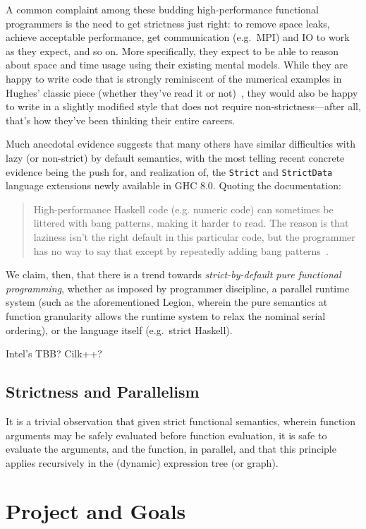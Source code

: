 \documentclass{llncs}
\begin{document}
A common complaint among these budding high-performance functional programmers
is the need to get strictness just right: to remove space leaks, achieve
acceptable performance, get communication (e.g.\ MPI) and IO to work as they
expect, and so on.  More specifically, they expect to be able to reason about
space and time usage using their existing mental models. While they are happy
to write code that is strongly reminiscent of the numerical examples in
Hughes' classic piece (whether they've read it or not)~\cite{Hughes89}, they
would also be happy to write in a slightly modified style that does not
require non-strictness---after all, that's how they've been thinking their
entire careers.

Much anecdotal evidence suggests that many others have similar difficulties
with lazy (or non-strict) by default semantics, with the most telling recent
concrete evidence being the push for, and realization of, the \texttt{Strict}
and \texttt{StrictData} language extensions newly available in GHC 8.0.
Quoting the documentation:
\begin{quote}
High-performance Haskell code (e.g. numeric code) can sometimes be littered
with bang patterns, making it harder to read. The reason is that laziness
isn't the right default in this particular code, but the programmer has no way
to say that except by repeatedly adding bang patterns~\cite{strict-strictdata}.
\end{quote}

We claim, then, that there is a trend towards \emph{strict-by-default pure
  functional programming}, whether as imposed by programmer discipline, a parallel
runtime system (such as the aforementioned Legion, wherein the pure semantics
at function granularity allows the runtime system to relax the nominal serial
ordering), or the language itself (e.g.\ strict Haskell).

Intel's TBB?  Cilk++?

\subsection{Strictness and Parallelism}

It is a trivial observation that given strict functional semantics, wherein
function arguments may be safely evaluated before function evaluation, it is
safe to evaluate the arguments, and the function, in parallel, and that this
principle applies recursively in the (dynamic) expression tree (or graph).

\section{Project and Goals}
\end{document}
